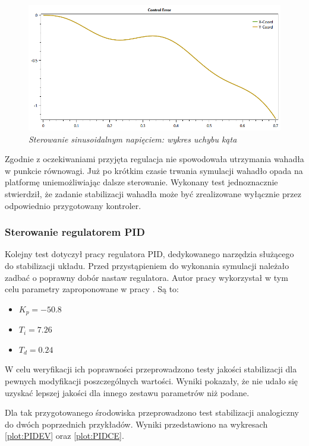 \documentclass[12pt, oneside]{report}
\theoremstyle{definition}
\begin{document}
\begin{figure}[H]
	\centering
		\includegraphics[width = 350pt]{SinusoidalCE} 
		\caption{\textit{Sterowanie sinusoidalnym napięciem: wykres uchybu kąta}}
		\label{plot:SinusoidalCE}
\end{figure}

Zgodnie z oczekiwaniami przyjęta regulacja nie spowodowała utrzymania wahadła w punkcie równowagi. Już po krótkim czasie trwania symulacji wahadło opada na platformę uniemożliwiając dalsze sterowanie. Wykonany test jednoznacznie stwierdził, że zadanie stabilizacji wahadła może być zrealizowane wyłącznie przez odpowiednio przygotowany kontroler.

\subsubsection{Sterowanie regulatorem PID}
Kolejny test dotyczył pracy regulatora PID, dedykowanego narzędzia służącego do stabilizacji układu. Przed przystąpieniem do wykonania symulacji należało zadbać o poprawny dobór nastaw regulatora. Autor pracy wykorzystał w tym celu parametry zaproponowane w pracy \cite{JTJT}. Są to:
\begin{itemize}
\item $K_p = -50.8$
\item $T_i = 7.26$
\item $T_d = 0.24$
\end{itemize}

W celu weryfikacji ich poprawności przeprowadzono testy jakości stabilizacji dla pewnych modyfikacji poszczególnych wartości. Wyniki pokazały, że nie udało się uzyskać lepszej jakości dla innego zestawu parametrów niż podane.

Dla tak przygotowanego środowiska przeprowadzono test stabilizacji analogiczny do dwóch poprzednich przykładów. Wyniki przedstawiono na wykresach \ref{plot:PIDEV} oraz  \ref{plot:PIDCE}.
\end{document}
